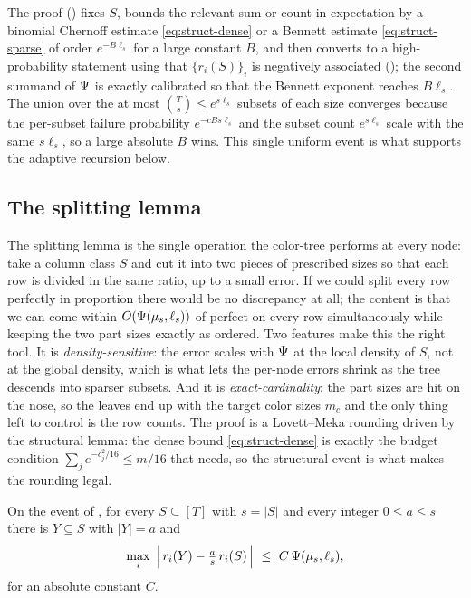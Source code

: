 The proof () fixes $S$, bounds the relevant sum or count in expectation by a binomial Chernoff
estimate \eqref{eq:struct-dense} or a Bennett estimate \eqref{eq:struct-sparse} of order $e^{-B\ell_s}$ for a large
constant $B$, and then converts to a high-probability statement using that $\{r_i(S)\}_i$ is negatively associated
(); the second summand of $\Psi$ is exactly calibrated so that the Bennett exponent reaches $B\ell_s$. The
union over the at most $\binom{T}{s}\le e^{s\ell_s}$ subsets of each size converges because the per-subset failure
probability $e^{-cBs\ell_s}$ and the subset count $e^{s\ell_s}$ scale with the same $s\ell_s$, so a large absolute $B$ wins.
This single uniform event is what supports the adaptive recursion below.

\subsection{The splitting lemma}\label{sec:split}

The splitting lemma is the single operation the color-tree performs at every node: take a column class $S$ and cut it into
two pieces of prescribed sizes so that each row is divided in the same ratio, up to a small error. If we could split every
row perfectly in proportion there would be no discrepancy at all; the content is that we can come within
$O(\Psi(\mu_s,\ell_s))$ of perfect on every row simultaneously while keeping the two part sizes exactly as ordered. Two
features make this the right tool. It is \emph{density-sensitive}: the error scales with $\Psi$ at the local density of
$S$, not at the global density, which is what lets the per-node errors shrink as the tree descends into sparser subsets. And
it is \emph{exact-cardinality}: the part sizes are hit on the nose, so the leaves end up with the target color sizes $m_c$
and the only thing left to control is the row counts. The proof is a Lovett--Meka rounding driven by the structural lemma:
the dense bound \eqref{eq:struct-dense} is exactly the budget condition $\sum_j e^{-c_j^2/16}\le m/16$ that
 needs, so the structural event is what makes the rounding legal.

\begin{lemma}\label{lem:split}
On the event of , for every $S\subseteq[T]$ with $s=|S|$ and every integer $0\le a\le s$ there is
$Y\subseteq S$ with $|Y|=a$ and
\[
  \max_{i}\ \Big|\,r_i(Y)-\tfrac{a}{s}\,r_i(S)\,\Big|\ \le\ C\,\Psifn(\mu_s,\ell_s),
\]
for an absolute constant $C$.
\end{lemma}

